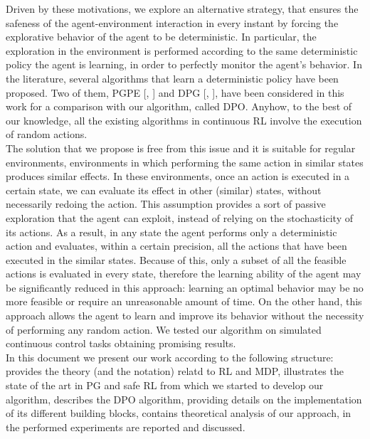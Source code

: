 \newline
Driven by these motivations, we explore an alternative strategy, that ensures the safeness of the agent-environment interaction in every instant by forcing the explorative behavior of the agent to be deterministic. In particular, the exploration in the environment is performed according to the same deterministic policy the agent is learning, in order to perfectly monitor the agent's behavior. In the literature, several algorithms that learn a deterministic policy have been proposed. Two of them, \acf{PGPE} [\citet{sehnke2008PolicyGradient}, ] and \acf{DPG} [\citet{article}, ], have been considered in this work for a comparison with our algorithm, called \acf{DPO}. Anyhow, to the best of our knowledge, all the existing algorithms in continuous \ac{RL} involve the execution of random actions.\\
\newline
The solution that we propose is free from this issue and it is suitable for regular environments, \ie environments in which performing the same action in similar states produces similar effects. In these environments, once an action is executed in a certain state, we can evaluate its effect in other (similar) states, without necessarily redoing the action. This assumption provides a sort of passive exploration that the agent can exploit, instead of relying on the stochasticity of its actions. As a result, in any state the agent performs only a deterministic action and evaluates, within a certain precision, all the actions that have been executed in the similar states. Because of this, only a subset of all the feasible actions is evaluated in every state, therefore the learning ability of the agent may be significantly reduced in this approach: learning an optimal behavior may be no more feasible or require an unreasonable amount of time. On the other hand, this approach allows the agent to learn and improve its behavior without the necessity of performing any random action. We tested our algorithm on simulated continuous control tasks obtaining promising results.\\
\newline
In this document we present our work according to the following structure:  provides the theory (and the notation) relatd to \acf{RL} and \acf{MDP},  illustrates the state of the art in \acf{PG} and safe \ac{RL} from which we started to develop our algorithm,  describes the \ac{DPO} algorithm, providing details on the implementation of its different building blocks,  contains theoretical analysis of our approach, in  the performed experiments are reported and discussed. 